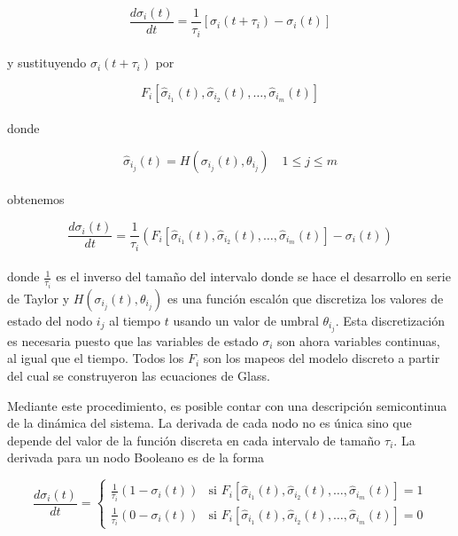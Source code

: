 \begin{equation}
\frac{d\sigma_i(t)}{dt} = \frac{1}{\tau_i} [\sigma_i(t+\tau_i) - \sigma_i(t)]
\end{equation}
\\
y sustituyendo $\sigma_i(t+\tau_i)$ por 

\begin{equation}
F_i[\hat{\sigma}_{i_1}(t), \hat{\sigma}_{i_2}(t), \ldots, \hat{\sigma}_{i_m}(t)]
\end{equation}
\\
donde

\begin{equation}
\hat{\sigma}_{i_j}(t) = H(\sigma_{i_j}(t), \theta_{i_j})\quad 1\le j \le m
\end{equation}
\\

obtenemos 

\begin{equation}
\frac{d\sigma_i(t)}{dt} = \frac{1}{\tau_i} (F_i[\hat{\sigma}_{i_1}(t), \hat{\sigma}_{i_2}(t), \ldots, \hat{\sigma}_{i_m}(t)]
 - \sigma_i(t))
\end{equation} 
\\
donde $\frac{1}{\tau_i}$ es el inverso del tamaño del intervalo donde se hace el desarrollo en serie de Taylor y $H(\sigma_{i_j}(t), \theta_{i_j})$ es una función escalón que discretiza los valores de estado del nodo $i_j$ al tiempo $t$ usando un valor de umbral $\theta_{i_j}$. Esta discretización es necesaria puesto que las variables de estado $\sigma_i$ son ahora variables continuas, al igual que el tiempo. Todos los $F_i$ son los mapeos del modelo discreto a partir del cual se construyeron las ecuaciones de Glass.

Mediante este procedimiento, es posible contar con una descripción semicontinua de la dinámica del sistema. La derivada de cada nodo no es única sino que depende del valor de la función discreta en cada intervalo de tamaño $\tau_i$. La derivada para un nodo Booleano es de la forma

\begin{equation}
\frac{d\sigma_i(t)}{dt} = \left\{
    \begin{array}{rr}
      \frac{1}{\tau_i} (1 - \sigma_i(t)) & \text{si } F_i[\hat{\sigma}_{i_1}(t), \hat{\sigma}_{i_2}(t), \ldots, \hat{\sigma}_{i_m}(t)] = 1\\
      \frac{1}{\tau_i} (0 - \sigma_i(t)) & \text{si } F_i[\hat{\sigma}_{i_1}(t), \hat{\sigma}_{i_2}(t), \ldots, \hat{\sigma}_{i_m}(t)] = 0
    \end{array} \right.
\end{equation} 
\\

